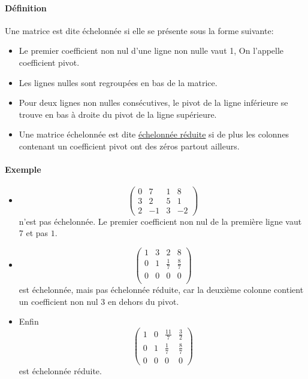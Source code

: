 \paragraph{Définition} Une matrice est dite échelonnée si elle se présente sous la forme suivante:
\begin{itemize}
  \item Le premier coefficient non nul d'une ligne non nulle vaut 1, On l'appelle coefficient pivot.
  \item Les lignes nulles sont regroupées en bas de la matrice.
  \item Pour deux lignes non nulles consécutives, le pivot de la ligne inférieure se trouve en bas à droite du pivot de la ligne supérieure.
  \item Une matrice échelonnée est dite \underline{échelonnée réduite} si de plus les colonnes contenant un coefficient pivot ont des zéros partout ailleurs.
\end{itemize}

\paragraph{Exemple}
\begin{itemize}
  \item $$\begin{pmatrix}
      0 & 7 & 1 & 8 \\
      3 & 2 & 5 & 1 \\
      2 & -1 & 3 & -2 
    \end{pmatrix}$$
    n'est pas échelonnée. Le premier coefficient non nul de la première ligne vaut $7$ et pas $1$.
    
  \item $$\begin{pmatrix}
      1 & 3 & 2 & 8 \\
      0 & 1 & \frac{1}{7} & \frac{8}{7} \\
      0 & 0 & 0 & 0 \\
    \end{pmatrix}$$
    est échelonnée, mais pas échelonnée réduite, car la deuxième colonne contient un coefficient non nul $3$ en dehors du pivot.
    
  \item Enfin
    $$\begin{pmatrix}
      1 & 0 & \frac{11}{7} & \frac{3}{2} \\
      0 & 1 & \frac{1}{7} & \frac{8}{7} \\
      0 & 0 & 0 & 0 
    \end{pmatrix}$$
    est échelonnée réduite.
\end{itemize}

